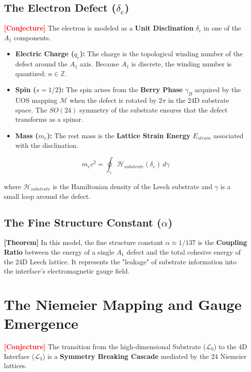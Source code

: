 \documentclass[11pt,titlepage]{article}
\newcommand{\substrate}{\mathcal{L}_0}
\newcommand{\interface}{\mathcal{L}_3}
\newcommand{\tagtheo}{\textcolor{green!60!black}{\textbf{[Theorem]}} }
\newcommand{\tagconj}{\textcolor{red}{\textbf{[Conjecture]}} }
\begin{document}
\subsection{The Electron Defect ($\delta_e$)}
\tagconj The electron is modeled as a \textbf{Unit Disclination} $\delta_e$ in one of the $A_1$ components. 
\begin{itemize}
    
\item \textbf{Electric Charge ($q_e$):} The charge is the topological winding number of the defect around the $A_1$ axis. Because $A_1$ is discrete, the winding number is quantized: $n \in \mathbb{Z}$.
    
\item \textbf{Spin ($s=1/2$):} The spin arises from the \textbf{Berry Phase} $\gamma_B$ acquired by the UOS mapping $\mathcal{M}$ when the defect is rotated by $2\pi$ in the 24D substrate space. The $SO(24)$ symmetry of the substrate ensures that the defect transforms as a spinor.
    
\item \textbf{Mass ($m_e$):} The rest mass is the \textbf{Lattice Strain Energy} $E_{strain}$ associated with the disclination.
\end{itemize}

\begin{equation}
m_e c^2 = \oint_{\gamma} \mathcal{H}_{substrate}(\delta_e) \, d\gamma
\end{equation}

where $\mathcal{H}_{substrate}$ is the Hamiltonian density of the Leech substrate and $\gamma$ is a small loop around the defect.

\subsection{The Fine Structure Constant ($\alpha$)}
\tagtheo In this model, the fine structure constant $\alpha \approx 1/137$ is the \textbf{Coupling Ratio} between the energy of a single $A_1$ defect and the total cohesive energy of the 24D Leech lattice. It represents the "leakage" of substrate information into the interface's electromagnetic gauge field.

\section{The Niemeier Mapping and Gauge Emergence}
\label{sec:niemeier}
\tagconj The transition from the high-dimensional Substrate ($\substrate$) to the 4D Interface ($\interface$) is a \textbf{Symmetry Breaking Cascade} mediated by the 24 Niemeier lattices.
\end{document}
